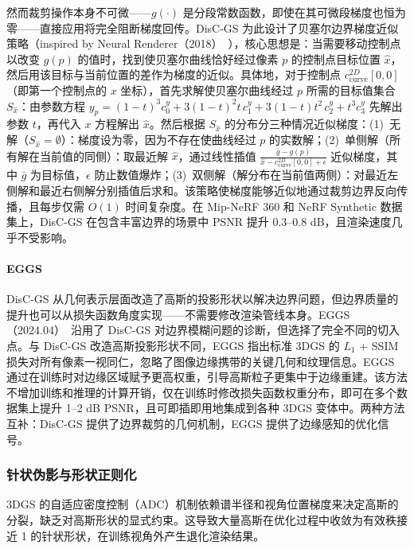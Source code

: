 然而裁剪操作本身不可微——$g(\cdot)$ 是分段常数函数，即使在其可微段梯度也恒为零——直接应用将完全阻断梯度回传。DisC-GS 为此设计了贝塞尔边界梯度近似策略（inspired by Neural Renderer（2018）~\cite{kato2018neural}），核心思想是：当需要移动控制点以改变 $g(p)$ 的值时，找到使贝塞尔曲线恰好经过像素 $p$ 的控制点目标位置 $\hat{x}$，然后用该目标与当前位置的差作为梯度的近似。具体地，对于控制点 $c_{\text{curve}}^{2D}[0,0]$（即第一个控制点的 $x$ 坐标），首先求解使贝塞尔曲线经过 $p$ 所需的目标值集合 $S_{\hat{x}}$：由参数方程 $y_p = (1-t)^3 c_0^y + 3(1-t)^2 t\, c_1^y + 3(1-t)t^2\,c_2^y + t^3 c_3^y$ 先解出参数 $t$，再代入 $x$ 方程解出 $\hat{x}$。然后根据 $S_{\hat{x}}$ 的分布分三种情况近似梯度：(1)~无解（$S_{\hat{x}} = \emptyset$）：梯度设为零，因为不存在使曲线经过 $p$ 的实数解；(2)~单侧解（所有解在当前值的同侧）：取最近解 $\hat{x}$，通过线性插值 $\frac{\bar{g} - g(p)}{\hat{x} - c_{\text{curve}}^{2D}[0,0] + \epsilon}$ 近似梯度，其中 $\bar{g}$ 为目标值，$\epsilon$ 防止数值爆炸；(3)~双侧解（解分布在当前值两侧）：对最近左侧解和最近右侧解分别插值后求和。该策略使梯度能够近似地通过裁剪边界反向传播，且每步仅需 $O(1)$ 时间复杂度。在 Mip-NeRF 360 和 NeRF Synthetic 数据集上，DisC-GS 在包含丰富边界的场景中 PSNR 提升 0.3--0.8 dB，且渲染速度几乎不受影响。

\paragraph{EGGS}
DisC-GS 从几何表示层面改造了高斯的投影形状以解决边界问题，但边界质量的提升也可以从损失函数角度实现——不需要修改渲染管线本身。EGGS（2024.04）~\cite{2404_09105}沿用了 DisC-GS 对边界模糊问题的诊断，但选择了完全不同的切入点。与 DisC-GS 改造高斯投影形状不同，EGGS 指出标准 3DGS 的 $L_1$ + SSIM 损失对所有像素一视同仁，忽略了图像边缘携带的关键几何和纹理信息。EGGS 通过在训练时对边缘区域赋予更高权重，引导高斯粒子更集中于边缘重建。该方法不增加训练和推理的计算开销，仅在训练时修改损失函数权重分布，即可在多个数据集上提升 1--2 dB PSNR，且可即插即用地集成到各种 3DGS 变体中。两种方法互补：DisC-GS 提供了边界裁剪的几何机制，EGGS 提供了边缘感知的优化信号。

\subsubsection{针状伪影与形状正则化}

3DGS 的自适应密度控制（ADC）机制依赖谱半径和视角位置梯度来决定高斯的分裂，缺乏对高斯形状的显式约束。这导致大量高斯在优化过程中收敛为有效秩接近 1 的针状形状，在训练视角外产生退化渲染结果。

